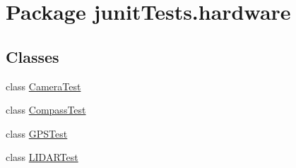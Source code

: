 \hypertarget{namespacejunit_tests_1_1hardware}{
\section{Package junitTests.hardware}
\label{namespacejunit_tests_1_1hardware}
}
\subsection*{Classes}
\begin{DoxyCompactItemize}
\item 
class \hyperlink{classjunit_tests_1_1hardware_1_1_camera_test}{CameraTest}
\item 
class \hyperlink{classjunit_tests_1_1hardware_1_1_compass_test}{CompassTest}
\item 
class \hyperlink{classjunit_tests_1_1hardware_1_1_g_p_s_test}{GPSTest}
\item 
class \hyperlink{classjunit_tests_1_1hardware_1_1_l_i_d_a_r_test}{LIDARTest}
\end{DoxyCompactItemize}
